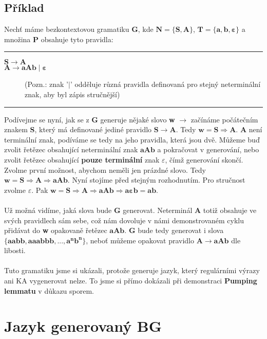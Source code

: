 \documentclass{report}
\begin{document}
\subsection*{Příklad}
Nechť máme bezkontextovou gramatiku \textbf{G}, kde $\mathbf{N = \{S,A\}}$, $\mathbf{T=\{a,b,\varepsilon\}}$ a množina \textbf{P} obsahuje tyto pravidla: 
\vspace{0.4cm}    
\hrule
\vspace{0.1cm}
\begin{description}
    \item[$\mathbf{S \rightarrow A}$]
    \item[$\mathbf{A \rightarrow aAb \mid \varepsilon}$] (Pozn.: znak '$\mathbf{\mid}$' odděluje různá pravidla definovaná pro stejný neterminální znak, aby byl zápis stručnější) 
\end{description}
\vspace{0.1cm}    
\hrule
\vspace{0.4cm} 
Podívejme se nyní, jak se z \textbf{G} generuje nějaké slovo \textbf{w} $\rightarrow$ začínáme počátečním znakem \textbf{S}, který má definované jediné pravidlo $\mathbf{S \rightarrow A}$. Tedy $\mathbf{w=S \Rightarrow A}$. \textbf{A} není terminální znak, podíváme se tedy na jeho pravidla, která jsou dvě. Můžeme buď zvolit řetězec obsahující neterminální znak $\mathbf{aAb}$ a pokračovat v generování, nebo zvolit řetězec obsahující \textbf{pouze terminální} znak $\varepsilon$, čímž generování skončí. Zvolme první možnost, abychom neměli jen prázdné slovo. Tedy $\mathbf{w = S \Rightarrow A \Rightarrow aAb}$. Nyní stojíme před stejným rozhodnutím. Pro stručnost zvolme $\varepsilon$. Pak $\mathbf{w = S \Rightarrow A \Rightarrow aAb \Rightarrow a\varepsilon{b}=ab}$.\\ \\
Už možná vidíme, jaká slova bude \textbf{G} generovat. Neterminál \textbf{A} totiž obsahuje ve svých pravidlech sám sebe, což nám dovoluje v námi demonstrovaném cyklu přidávat do \textbf{w} opakovaně řetězec $\mathbf{aAb}$. \textbf{G} bude tedy generovat i slova $\mathbf{\{aabb, aaabbb, ...,a^nb^n\}}$, neboť můžeme opakovat pravidlo $\mathbf{A \rightarrow aAb}$ dle libosti.\\ \\
Tuto gramatiku jsme si ukázali, protože generuje jazyk, který regulárními výrazy ani KA vygenerovat nelze. To jsme si přímo dokázali při demonstraci \textbf{Pumping lemmatu} v důkazu sporem.
\section{Jazyk generovaný BG}
\end{document}
